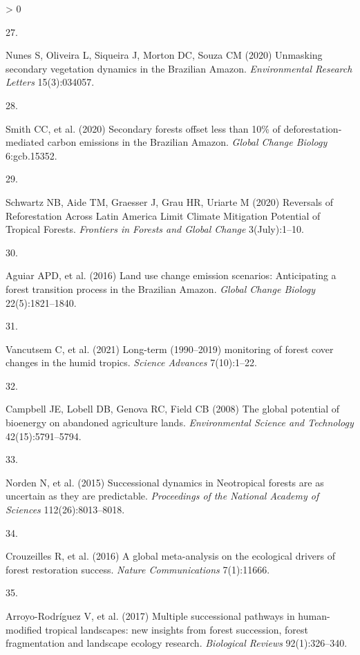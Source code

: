 \documentclass[9pt,twocolumn,twoside,lineno]{pnas-new}
\newlength{\csllabelwidth}
\newlength{\cslhangindent}
\newenvironment{CSLReferences}[2] %
 {%
  \setlength{\parindent}{0pt}
  \ifodd #1 \everypar{\setlength{\hangindent}{\cslhangindent}}\ignorespaces\fi
  \ifnum #2 > 0
  \setlength{\parskip}{#2\baselineskip}
  \fi
 }%
 {}
\newcommand{\CSLLeftMargin}[1]{\parbox[t]{\csllabelwidth}{#1}}
\newcommand{\CSLRightInline}[1]{\parbox[t]{\linewidth - \csllabelwidth}{#1}\break}
\begin{document}
\begin{CSLReferences}{0}{0}
\leavevmode\hypertarget{ref-Nunes2020}{}%
\CSLLeftMargin{27. }
\CSLRightInline{Nunes S, Oliveira L, Siqueira J, Morton DC, Souza CM (2020) {Unmasking secondary vegetation dynamics in the Brazilian Amazon}. \emph{Environmental Research Letters} 15(3):034057.}

\leavevmode\hypertarget{ref-Smith2020}{}%
\CSLLeftMargin{28. }
\CSLRightInline{Smith CC, et al. (2020) {Secondary forests offset less than 10{\%} of deforestation‐mediated carbon emissions in the Brazilian Amazon}. \emph{Global Change Biology} 6:gcb.15352.}

\leavevmode\hypertarget{ref-Schwartz2020}{}%
\CSLLeftMargin{29. }
\CSLRightInline{Schwartz NB, Aide TM, Graesser J, Grau HR, Uriarte M (2020) {Reversals of Reforestation Across Latin America Limit Climate Mitigation Potential of Tropical Forests}. \emph{Frontiers in Forests and Global Change} 3(July):1--10.}

\leavevmode\hypertarget{ref-Aguiar2016}{}%
\CSLLeftMargin{30. }
\CSLRightInline{Aguiar APD, et al. (2016) {Land use change emission scenarios: Anticipating a forest transition process in the Brazilian Amazon}. \emph{Global Change Biology} 22(5):1821--1840.}

\leavevmode\hypertarget{ref-Vancutsem2021}{}%
\CSLLeftMargin{31. }
\CSLRightInline{Vancutsem C, et al. (2021) {Long-term (1990--2019) monitoring of forest cover changes in the humid tropics}. \emph{Science Advances} 7(10):1--22.}

\leavevmode\hypertarget{ref-Campbell2008}{}%
\CSLLeftMargin{32. }
\CSLRightInline{Campbell JE, Lobell DB, Genova RC, Field CB (2008) {The global potential of bioenergy on abandoned agriculture lands}. \emph{Environmental Science and Technology} 42(15):5791--5794.}

\leavevmode\hypertarget{ref-Norden2015}{}%
\CSLLeftMargin{33. }
\CSLRightInline{Norden N, et al. (2015) {Successional dynamics in Neotropical forests are as uncertain as they are predictable}. \emph{Proceedings of the National Academy of Sciences} 112(26):8013--8018.}

\leavevmode\hypertarget{ref-Crouzeilles2016}{}%
\CSLLeftMargin{34. }
\CSLRightInline{Crouzeilles R, et al. (2016) {A global meta-analysis on the ecological drivers of forest restoration success}. \emph{Nature Communications} 7(1):11666.}

\leavevmode\hypertarget{ref-Arroyo-Rodriguez2017}{}%
\CSLLeftMargin{35. }
\CSLRightInline{Arroyo-Rodríguez V, et al. (2017) {Multiple successional pathways in human-modified tropical landscapes: new insights from forest succession, forest fragmentation and landscape ecology research}. \emph{Biological Reviews} 92(1):326--340.}


\end{CSLReferences}
\end{document}
